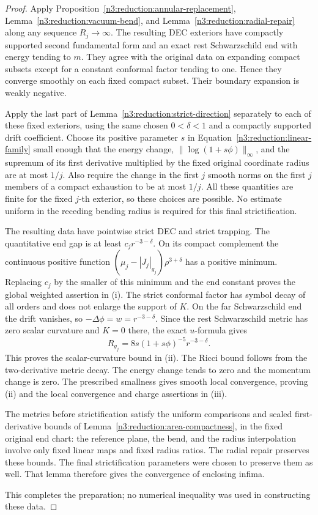 \begin{proof}
Apply Proposition~\ref{n3:reduction:annular-replacement},
Lemma~\ref{n3:reduction:vacuum-bend}, and
Lemma~\ref{n3:reduction:radial-repair} along any sequence $R_j\to\infty$.
The resulting DEC exteriors have compactly supported second fundamental
form and an exact rest Schwarzschild end with energy tending to $m$.
They agree with the original data on expanding compact subsets except
for a constant conformal factor tending to one.  Hence they converge
smoothly on each fixed compact subset.  Their boundary expansion is
weakly negative.

Apply the last part of Lemma~\ref{n3:reduction:strict-direction} separately
to each of these fixed exteriors, using the same chosen
$0<\delta<1$ and a compactly supported drift coefficient.  Choose its
positive parameter $s$ in Equation~\eqref{n3:reduction:linear-family}
small enough that the energy change, $\|\log(1+s\phi)\|_\infty$, and
the supremum of its first derivative multiplied by the fixed original
coordinate radius are at most $1/j$.  Also require the change in the
first $j$ smooth norms on the first $j$ members of a compact exhaustion
to be at most $1/j$.
All these quantities are finite for the fixed $j$-th exterior, so these
choices are possible.  No estimate uniform in the receding bending
radius is required for this final strictification.

The resulting data have pointwise strict DEC and strict trapping.
The quantitative end gap is at least $c_j r^{-3-\delta}$. On its compact
complement the continuous positive function
$(\mu_j-|J_j|_{g_j})\rho^{3+\delta}$ has a positive minimum.
Replacing $c_j$ by the smaller of this minimum and the end constant
proves the global weighted assertion in \textup{(i)}. The strict conformal factor has
symbol decay of all orders and does not enlarge the support of $K$.
On the far Schwarzschild end the drift vanishes, so
$-\Delta\phi=w=r^{-3-\delta}$. Since the rest Schwarzschild metric
has zero scalar curvature and $K=0$ there, the exact $u$-formula gives
\[
 R_{g_j}=8s(1+s\phi)^{-5}r^{-3-\delta}.
\]
This proves the scalar-curvature bound in \textup{(ii)}.
The Ricci bound follows from
the two-derivative metric decay. The energy change tends to zero and the
momentum change is zero. The prescribed smallness gives smooth local
convergence, proving \textup{(ii)} and the local convergence and charge
assertions in \textup{(iii)}.

The metrics before strictification satisfy the uniform comparisons and
scaled first-derivative bounds of
Lemma~\ref{n3:reduction:area-compactness}, in the fixed original end chart:
the reference plane, the bend, and the radius interpolation involve only
fixed linear maps and fixed radius ratios.  The radial repair preserves
these bounds.  The final strictification parameters were chosen to
preserve them as well.  That lemma therefore gives the convergence of
enclosing infima.

This completes the preparation; no numerical inequality was used in
constructing these data.
\end{proof}

